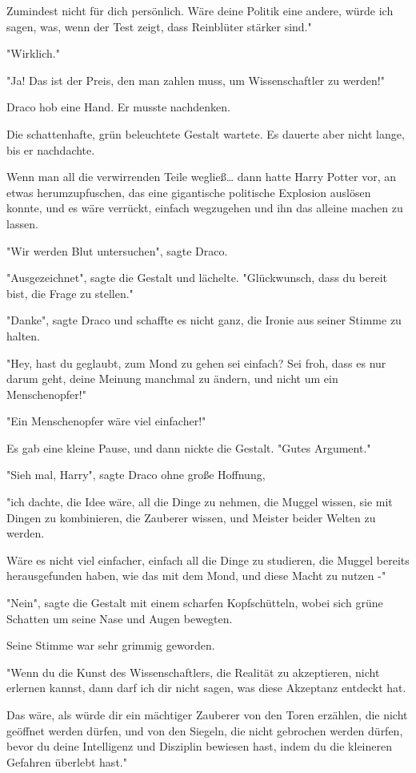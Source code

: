 {Zumindest nicht für dich persönlich. Wäre deine Politik eine andere, würde ich sagen, was, wenn der Test zeigt, dass Reinblüter stärker sind."

"Wirklich."

"Ja! Das ist der Preis, den man zahlen muss, um Wissenschaftler zu werden!"

Draco hob eine Hand. Er musste nachdenken.

Die schattenhafte, grün beleuchtete Gestalt wartete. Es dauerte aber nicht lange, bis er nachdachte.

Wenn man all die verwirrenden Teile wegließ… dann hatte Harry Potter vor, an etwas herumzupfuschen, das eine gigantische politische Explosion auslösen konnte, und es wäre verrückt, einfach wegzugehen und ihn das alleine machen zu lassen.

"Wir werden Blut untersuchen", sagte Draco.

"Ausgezeichnet", sagte die Gestalt und lächelte. "Glückwunsch, dass du bereit bist, die Frage zu stellen."

"Danke", sagte Draco und schaffte es nicht ganz, die Ironie aus seiner Stimme zu halten.

"Hey, hast du geglaubt, zum Mond zu gehen sei einfach? Sei froh, dass es nur darum geht, deine Meinung manchmal zu ändern, und nicht um ein Menschenopfer!"

"Ein Menschenopfer wäre viel einfacher!"

Es gab eine kleine Pause, und dann nickte die Gestalt. "Gutes Argument."

"Sieh mal, Harry", sagte Draco ohne große Hoffnung,

"ich dachte, die Idee wäre, all die Dinge zu nehmen, die Muggel wissen, sie mit Dingen zu kombinieren, die Zauberer wissen, und Meister beider Welten zu werden.

Wäre es nicht viel einfacher, einfach all die Dinge zu studieren, die Muggel bereits herausgefunden haben, wie das mit dem Mond, und diese Macht zu nutzen -"

"Nein", sagte die Gestalt mit einem scharfen Kopfschütteln, wobei sich grüne Schatten um seine Nase und Augen bewegten.

Seine Stimme war sehr grimmig geworden.

"Wenn du die Kunst des Wissenschaftlers, die Realität zu akzeptieren, nicht erlernen kannst, dann darf ich dir nicht sagen, was diese Akzeptanz entdeckt hat.

Das wäre, als würde dir ein mächtiger Zauberer von den Toren erzählen, die nicht geöffnet werden dürfen, und von den Siegeln, die nicht gebrochen werden dürfen, bevor du deine Intelligenz und Disziplin bewiesen hast, indem du die kleineren Gefahren überlebt hast."

}
